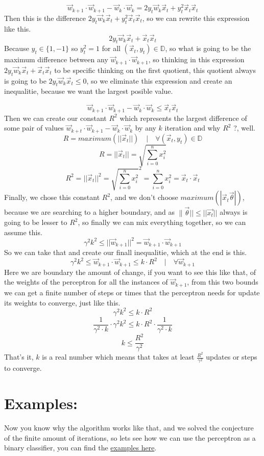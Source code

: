 \documentclass[12pt]{article}
\begin{document}
\[
  \vec{w}_{k + 1} \cdot \vec{w}_{k + 1} - \vec{w}_k \cdot \vec{w}_k
  = 2y_t\vec{w}_k\vec{x}_t + y_t^2\vec{x}_t\vec{x}_t
\]
Then this is the difference $2y_t\vec{w}_k\vec{x}_t + y_t^2\vec{x}_t\vec{x}_t$,
so we can rewrite this expression
like this.
\[
  2y_t\vec{w}_k\vec{x}_t + \vec{x}_t\vec{x}_t
\]
Because $y_t \in \{1, -1\}$ so $y_t^2 = 1$ for all $(\vec{x}_t, y_t) \in \mathbb{D}$, so what is going
to be the maximum difference between any $\vec{w}_{k+1} \cdot \vec{w}_{k+1}$, so thinking in this
expression $2y_t\vec{w}_k\vec{x}_t + \vec{x}_t\vec{x}_t$ to be specific thinking on the first quotient,
this quotient always is going to be $2y_t\vec{w}_k\vec{x}_t \le 0$, so we eliminate this
expression and create an inequalitie, because we want the largest posible value.

\[
  \vec{w}_{k + 1} \cdot \vec{w}_{k + 1} - \vec{w}_k \cdot \vec{w}_k
  \le \vec{x}_t\vec{x}_t
\]
Then we can create our constant $R^2$
 which represents the largest
difference of some pair of values $\vec{w}_{k+t} \cdot \vec{w}_{k+1} - \vec{w}_{k} \cdot \vec{w}_k$
by any $k$ iteration and why $R^2$ ?, well.
\[
  R = maximum(||\vec{x}_t||) \quad|\quad \forall (\vec{x}_t, y_t) \in \mathbb{D}
\]
\[
  R = ||\vec{x}_t|| = \sqrt{\sum_{i = 0}^{n}x_i^2}
\]
\[
  R^2 = ||\vec{x}_t||^2 = \sqrt{\sum_{i = 0}^{n}x_i^2}^2 = \sum_{i = 0}^{n}x_i^2 = \vec{x}_t \cdot \vec{x}_t
\]
Finally, we chose this constant $R^2$, and we don't choose $maximum(|\vec{x}_t\vec{\theta}|)$,
because we are searching to a higher boundary, and as $\|\vec{\theta}|| \le ||\vec{x_t}||$ always
is going to be lesser to $R^2$, so finally we can mix everything together, so we can assume this.
\[
  \gamma^2k^2 \le ||\vec{w}_{k+1}||^2 = \vec{w}_{k+1} \cdot \vec{w}_{k+1}
\]
So we can take that and create our finall inequalitie, which at the end is this.
\[
  \gamma^2k^2 \le \vec{w}_{k+1} \cdot \vec{w}_{k+1} \le k \cdot R^2\quad |\quad \forall\vec{w}_{k+1}
\]
Here we are boundary the amount of change, if you want to see this like
that, of the weights of the perceptron
for all the instances of $\vec{w}_{k + 1}$, from this two bounds we can get a finite number
of steps or times that the perceptron needs for update its weights to converge, just like this.
\[
  \gamma^2k^2 \le k \cdot R^2
\]
\[
  \frac{1}{\gamma^2 \cdot k} \cdot \gamma^2k^2 \le k \cdot R^2 \cdot \frac{1}{\gamma^2 \cdot k}
\]
\[
  k \le \frac{R^2}{\gamma^2}
\]
That's it, $k$ is a real number which means that takes at least $\frac{R^2}{\gamma^2}$
updates or steps to converge.

\section{Examples:}
Now you know why the algorithm works like that, and we solved the conjecture of the finite amount
of iterations, so lets see how we can use the perceptron as a binary classifier,
you can find the
\href{https://github.com/alecksandr26/machine-learning-code/tree/main/examples}{examples here}.
\end{document}
